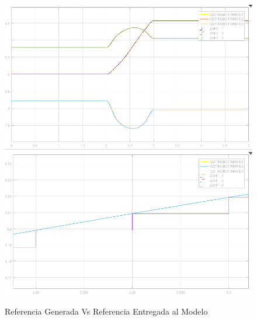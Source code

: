 \begin{itemize}
	
		\begin{figure}[h!]
			\centering
			\includegraphics[width=.4\textwidth]{ZoHComparativa} \hspace{0.2cm} \includegraphics[width=.4\textwidth]{ZoHComparativaDetalle}
			\caption{Referencia Generada Vs Referencia Entregada al Modelo}
		\end{figure}




	\end{itemize}
